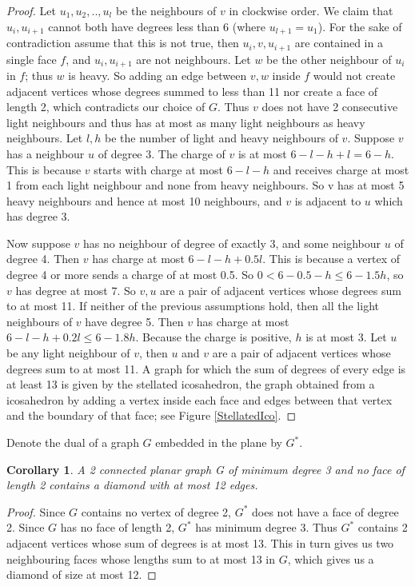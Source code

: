 \documentclass{article}
\newcommand{\0}{\mathbb{0}}
\newcommand{\1}{\mathbb{1}}
\newtheorem{cor}[theorem]{Corollary}
\begin{document}
\begin{proof}
 Let $u_1,u_2,..,u_l$ be the neighbours of $v$ in clockwise order. We claim that $u_i,u_{i+1}$ cannot both have degrees less than 6 (where $u_{l+1} =u_1$). For the sake of contradiction assume that this is not true, then $ u_i,v,u_{i+1} $ are contained in a single face $f$, and $u_i,u_{i+1}$ are not neighbours. Let $w$ be the other neighbour of $u_i$ in $f$; thus $w$ is heavy. So adding an edge between $v,w$ inside $f$ would not create adjacent vertices whose degrees summed to less than 11 nor create a face of length 2, which contradicts our choice of $G$.  Thus $v$ does not have 2 consecutive light neighbours and thus has at most as many light neighbours as heavy neighbours.  Let $l, h$ be the number of light and heavy neighbours of $v$. Suppose $v$ has a neighbour $u$ of degree 3. The charge of $v$ is at most  $6-l-h +l =6 -h $. This is because $v$ starts with charge at most $6-l-h$ and receives charge at most 1 from each light neighbour and none from heavy neighbours. So v has at most 5 heavy neighbours and hence at most 10 neighbours, and $v$ is adjacent to $u$ which has degree 3. 
 
 Now suppose $v$ has no neighbour of degree of exactly 3, and some neighbour $u$ of degree 4. Then $v$ has charge at most $ 6-l-h +0.5l $. This is because a vertex of degree 4 or more sends a charge of at most 0.5.   So $ 0 < 6-0.5-h \leq 6- 1.5h $, so $v$ has degree at most 7. So $v,u$ are a pair of adjacent vertices whose degrees sum to at most 11. If neither of the previous assumptions hold, then all the light neighbours of $v$ have degree 5. Then $v$ has charge at most $ 6-l-h +0.2l \leq 6-1.8h $. Because the charge is positive, $h$ is at most 3. Let $u$ be any light neighbour of $v$, then $u$ and $v$ are a pair of adjacent vertices whose degrees sum to at most 11. A graph for which the sum of degrees of every edge is at least 13 is given by the stellated icosahedron, the graph obtained from a icosahedron  by adding a vertex  inside each face and edges between that vertex and the boundary of that face; see Figure \ref{StellatedIco}.
 \end{proof}
 

Denote the dual of a graph $G$ embedded in the plane by $G^*$.   %
\begin{cor}\label{small diamond}
A 2 connected planar graph G of minimum degree 3 and no face of length 2 contains a diamond with at most 12 edges.
\end{cor}
\begin{proof}
 Since $G$ contains no vertex of degree 2, $G^*$ does not have a face of degree 2. Since $G$ has no face of length 2, $G^*$ has minimum degree 3. Thus $G^*$ contains 2 adjacent vertices whose sum of degrees is at most 13. This in turn  gives us two neighbouring faces whose lengths sum to at most 13 in $G$, which gives us a diamond of size at most 12.
\end{proof}
\end{document}
